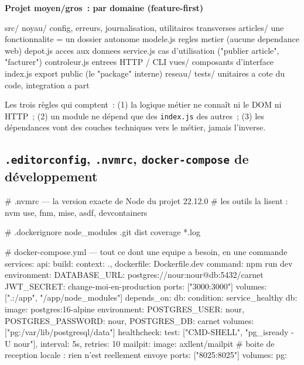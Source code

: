 \documentclass[12pt,a4paper,twoside,openright]{book}
\newcommand{\etape}[1]{\par\medskip\noindent\textbf{\large #1}\par\smallskip}
\begin{document}
\etape{Projet moyen/gros~: par domaine (feature-first)}
\begin{codeplain}
src/
  noyau/            config, erreurs, journalisation, utilitaires transverses
  articles/         une fonctionnalite = un dossier autonome
    modele.js       regles metier (aucune dependance web)
    depot.js        acces aux donnees
    service.js      cas d'utilisation ("publier article", "facturer")
    controleur.js   entrees HTTP / CLI
    vues/           composants d'interface
    index.js        export public (le "package" interne)
  reseau/
  tests/            unitaires a cote du code, integration a part
\end{codeplain}

Les trois r\`egles qui comptent~: (1) la logique m\'etier ne conna\^it ni le DOM ni HTTP~;
(2) un module ne d\'epend que des \verb|index.js| des autres~; (3) les d\'ependances vont des
couches techniques vers le m\'etier, jamais l'inverse.

\subsection{\texttt{.editorconfig}, \texttt{.nvmrc}, \texttt{docker-compose} de d\'eveloppement}

\begin{codeplain}
# .nvmrc --- la version exacte de Node du projet
22.12.0
# les outils la lisent : nvm use, fnm, mise, asdf, devcontainers

# .dockerignore
node_modules
.git
dist
coverage
*.log
\end{codeplain}

\begin{codeyml}
# docker-compose.yml --- tout ce dont une equipe a besoin, en une commande
services:
  api:
    build: { context: ., dockerfile: Dockerfile.dev }
    command: npm run dev
    environment:
      DATABASE_URL: postgres://nour:nour@db:5432/carnet
      JWT_SECRET: change-moi-en-production
    ports: ["3000:3000"]
    volumes: [".:/app", "/app/node_modules"]
    depends_on: { db: { condition: service_healthy } }
  db:
    image: postgres:16-alpine
    environment: { POSTGRES_USER: nour, POSTGRES_PASSWORD: nour, POSTGRES_DB: carnet }
    volumes: ["pg:/var/lib/postgresql/data"]
    healthcheck: { test: ["CMD-SHELL", "pg_isready -U nour"], interval: 5s, retries: 10 }
  mailpit:
    image: axllent/mailpit        # boite de reception locale : rien n'est reellement envoye
    ports: ["8025:8025"]
volumes: { pg: {} }
\end{codeyml}
\end{document}
